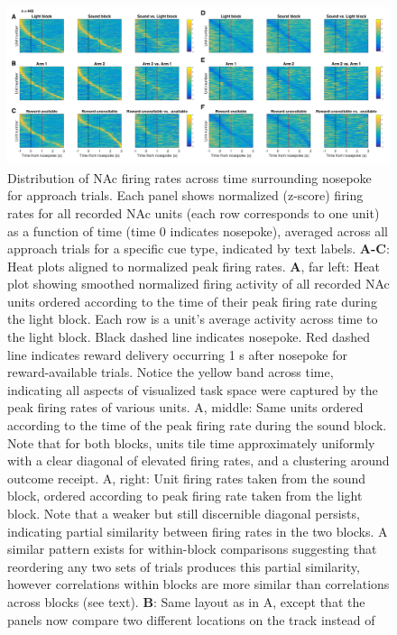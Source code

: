 \documentclass[11pt]{article}
\newcommand{\bsf}[1]{\textbf{#1}}
\providecommand{\DIFaddbeginFL}{} %
\providecommand{\DIFaddendFL}{} %
\providecommand{\DIFdelbeginFL}{} %
\providecommand{\DIFdelendFL}{} %
\newcommand{\DIFscaledelfig}{0.5}
\newlength{\DIFdelgraphicswidth} %
\newlength{\DIFdelgraphicsheight} %
\newcommand{\DIFaddincludegraphics}[2][]{{\color{blue}\fbox{\DIFOincludegraphics[#1]{#2}}}} %
\newcommand{\DIFdelincludegraphics}[2][]{%
\sbox{\DIFdelgraphicsbox}{\DIFOincludegraphics[#1]{#2}}%
\settoboxwidth{\DIFdelgraphicswidth}{\DIFdelgraphicsbox} %
\settoboxtotalheight{\DIFdelgraphicsheight}{\DIFdelgraphicsbox} %
\scalebox{\DIFscaledelfig}{%
\parbox[b]{\DIFdelgraphicswidth}{\usebox{\DIFdelgraphicsbox}\\[-\baselineskip] \rule{\DIFdelgraphicswidth}{0em}}\llap{\resizebox{\DIFdelgraphicswidth}{\DIFdelgraphicsheight}{%
\setlength{\unitlength}{\DIFdelgraphicswidth}%
\begin{picture}(1,1)%
\thicklines\linethickness{2pt} %
{\color[rgb]{1,0,0}\put(0,0){\framebox(1,1){}}}%
{\color[rgb]{1,0,0}\put(0,0){\line( 1,1){1}}}%
{\color[rgb]{1,0,0}\put(0,1){\line(1,-1){1}}}%
\end{picture}%
}\hspace*{3pt}}} %
} %
\DeclareRobustCommand{\DIFaddbeginFL}{\DIFOaddbeginFL \let\includegraphics\DIFaddincludegraphics} %
\DeclareRobustCommand{\DIFaddendFL}{\DIFOaddendFL \let\includegraphics\DIFOincludegraphics} %
\DeclareRobustCommand{\DIFdelbeginFL}{\DIFOdelbeginFL \let\includegraphics\DIFdelincludegraphics} %
\DeclareRobustCommand{\DIFdelendFL}{\DIFOaddendFL \let\includegraphics\DIFOincludegraphics} %
\begin{document}
\begin{figure}
[h]
\centering
\DIFdelbeginFL %
\DIFdelendFL \DIFaddbeginFL \includegraphics[width=\textwidth]{Fig 12 - NP task tiling.png}
\DIFaddendFL \caption{Distribution of NAc firing rates across time surrounding nosepoke for approach
trials. Each panel shows normalized (z-score) firing rates for all recorded NAc units
(each row corresponds to one unit) as a function of time (time 0 indicates
nosepoke), averaged across all approach trials for a specific cue type,
indicated by text labels. \bsf{A-C}: Heat plots aligned to normalized peak firing rates. \bsf{A}, far left: Heat plot showing smoothed
normalized firing activity of all recorded NAc units ordered according to the
time of their peak firing rate during the light block. Each row is a unit’s
average activity across time to the light block. Black dashed line indicates
nosepoke. Red dashed line indicates reward delivery occurring 1 s after
nosepoke for reward-available trials. Notice the yellow band across time,
indicating all aspects of visualized task space were captured by the peak
firing rates of various units. A, middle: Same units ordered according to
the time of the peak firing rate during the sound block. Note that for both
blocks, units tile time approximately uniformly with a clear diagonal of
elevated firing rates, and a clustering around outcome receipt. A, right: Unit firing rates taken from the sound block, ordered according to peak
firing rate taken from the light block. Note that a weaker but still
discernible diagonal persists, indicating partial similarity between firing
rates in the two blocks. A similar pattern exists for within-block comparisons suggesting that
reordering any two sets of trials produces this partial similarity, however
correlations within blocks are more similar than correlations across blocks
(see text). \bsf{B}: Same layout as in A, except
that the panels now compare two different locations on the track instead of
}
\end{figure}
\end{document}
